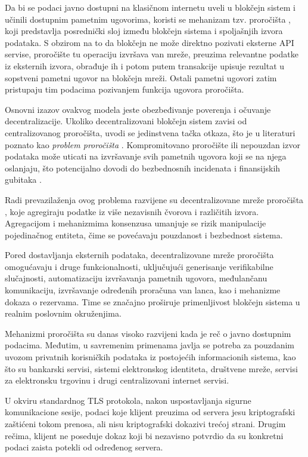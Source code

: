 Da bi se podaci javno dostupni na klasičnom internetu uveli u blokčejn sistem i učinili dostupnim pametnim ugovorima, koristi se mehanizam tzv. proročišta \cite{beniiche2020study} , koji predstavlja posrednički sloj između blokčejn sistema i spoljašnjih izvora podataka. S obzirom na to da blokčejn ne može direktno pozivati eksterne API servise, proročište tu operaciju izvršava van mreže, preuzima relevantne podatke iz eksternih izvora, obrađuje ih i potom putem transakcije upisuje rezultat u sopstveni pametni ugovor na blokčejn mreži. Ostali pametni ugovori zatim pristupaju tim podacima pozivanjem funkcija ugovora proročišta.

Osnovni izazov ovakvog modela jeste obezbeđivanje poverenja i očuvanje decentralizacije. Ukoliko decentralizovani blokčejn sistem zavisi od centralizovanog proročišta, uvodi se jedinstvena tačka otkaza, što je u literaturi poznato kao \textit{problem proročišta} . Kompromitovano proročište ili nepouzdan izvor podataka može uticati na izvršavanje svih pametnih ugovora koji se na njega oslanjaju, što potencijalno dovodi do bezbednosnih incidenata i finansijskih gubitaka \cite{arora2024secplf}.

Radi prevazilaženja ovog problema razvijene su decentralizovane mreže proročišta \cite{breidenbach2021chainlink} , koje agregiraju podatke iz više nezavisnih čvorova i različitih izvora. Agregacijom i mehanizmima konsenzusa umanjuje se rizik manipulacije pojedinačnog entiteta, čime se povećavaju pouzdanost i bezbednost sistema.

Pored dostavljanja eksternih podataka, decentralizovane mreže proročišta omogućavaju i druge funkcionalnosti, uključujući generisanje verifikabilne slučajnosti, automatizaciju izvršavanja pametnih ugovora, međulančanu komunikaciju, izvršavanje određenih proračuna van lanca, kao i mehanizme dokaza o rezervama. Time se značajno proširuje primenljivost blokčejn sistema u realnim poslovnim okruženjima.

Mehanizmi proročišta su danas visoko razvijeni kada je reč o javno dostupnim podacima. Međutim, u savremenim primenama javlja se potreba za pouzdanim uvozom privatnih korisničkih podataka iz postojećih informacionih sistema, kao što su bankarski servisi, sistemi elektronskog identiteta, društvene mreže, servisi za elektronsku trgovinu i drugi centralizovani internet servisi.

U okviru standardnog TLS protokola, nakon uspostavljanja sigurne komunikacione sesije, podaci koje klijent preuzima od servera jesu kriptografski zaštićeni tokom prenosa, ali nisu kriptografski dokazivi trećoj strani. Drugim rečima, klijent ne poseduje dokaz koji bi nezavisno potvrdio da su konkretni podaci zaista potekli od određenog servera.

